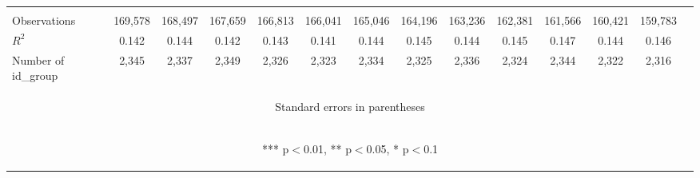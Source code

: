 \begin{table}
\begin{center}
{\begin{tabular}{lccccccccccccc}
\vspace{4pt} & \begin{footnotesize}\end{footnotesize} & \begin{footnotesize}\end{footnotesize} & \begin{footnotesize}\end{footnotesize} & \begin{footnotesize}\end{footnotesize} & \begin{footnotesize}\end{footnotesize} & \begin{footnotesize}\end{footnotesize} & \begin{footnotesize}\end{footnotesize} & \begin{footnotesize}\end{footnotesize} & \begin{footnotesize}\end{footnotesize} & \begin{footnotesize}\end{footnotesize} & \begin{footnotesize}\end{footnotesize} & \begin{footnotesize}\end{footnotesize} & \begin{footnotesize}\end{footnotesize} \\
Observations  & 169,578 & 168,497 & 167,659 & 166,813 & 166,041 & 165,046 & 164,196 & 163,236 & 162,381 & 161,566 & 160,421 & 159,783 \\
$R^2$ & 0.142 & 0.144 & 0.142 & 0.143 & 0.141 & 0.144 & 0.145 & 0.144 & 0.145 & 0.147 & 0.144 & 0.146 \\
 Number of id\_group & 2,345 & 2,337 & 2,349 & 2,326 & 2,323 & 2,334 & 2,325 & 2,336 & 2,324 & 2,344 & 2,322 & 2,316 \\ \hline
\multicolumn{14}{c}{\begin{footnotesize} Standard errors in parentheses\end{footnotesize}} \\
\multicolumn{14}{c}{\begin{footnotesize} *** p$<$0.01, ** p$<$0.05, * p$<$0.1\end{footnotesize}} \\
\end{tabular}}
\end{center}
\end{table}


